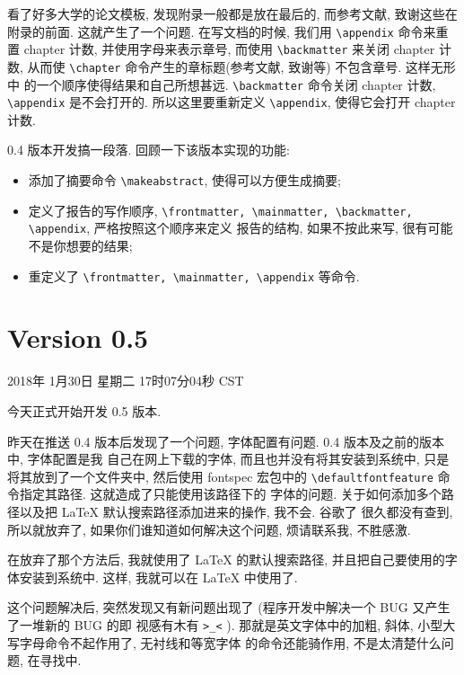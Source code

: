 \documentclass{cugrep}
\begin{document}
看了好多大学的论文模板, 发现附录一般都是放在最后的, 而参考文献, 致谢这些在附录的前面. 这就产生了一个问题.
在写文档的时候, 我们用 \verb|\appendix| 命令来重置 chapter 计数, 并使用字母来表示章号, 而使用 \verb|\backmatter| 
来关闭 chapter 计数, 从而使 \verb|\chapter| 命令产生的章标题(参考文献, 致谢等) 不包含章号. 这样无形中
的一个顺序使得结果和自己所想甚远. \verb|\backmatter| 命令关闭 chapter 计数, \verb|\appendix| 是不会打开的.
所以这里要重新定义 \verb|\appendix|, 使得它会打开 chapter 计数. 

0.4 版本开发搞一段落. 回顾一下该版本实现的功能:

\begin{itemize}
    \item 添加了摘要命令 \verb|\makeabstract|, 使得可以方便生成摘要;
    \item 定义了报告的写作顺序, \verb|\frontmatter, \mainmatter, \backmatter, \appendix|, 严格按照这个顺序来定义
        报告的结构, 如果不按此来写, 很有可能不是你想要的结果;
    \item 重定义了 \verb|\frontmatter, \mainmatter, \appendix| 等命令.
\end{itemize}

\section{Version 0.5}

2018年 1月30日 星期二 17时07分04秒 CST

今天正式开始开发 0.5 版本.

昨天在推送 0.4 版本后发现了一个问题, 字体配置有问题. 0.4 版本及之前的版本中, 字体配置是我
自己在网上下载的字体, 而且也并没有将其安装到系统中, 只是将其放到了一个文件夹中, 然后使用
fontspec 宏包中的 \verb|\defaultfontfeature| 命令指定其路径. 这就造成了只能使用该路径下的
字体的问题. 关于如何添加多个路径以及把 \LaTeX{} 默认搜索路径添加进来的操作, 我不会. 谷歌了
很久都没有查到, 所以就放弃了, 如果你们谁知道如何解决这个问题, 烦请联系我, 不胜感激. 

在放弃了那个方法后, 我就使用了 \LaTeX{} 的默认搜索路径, 并且把自己要使用的字体安装到系统中.
这样, 我就可以在 \LaTeX{} 中使用了. 

这个问题解决后, 突然发现又有新问题出现了 (程序开发中解决一个 BUG 又产生了一堆新的 BUG 的即
视感有木有 \verb|>_<| ). 那就是英文字体中的加粗, 斜体, 小型大写字母命令不起作用了, 无衬线和等宽字体
的命令还能骑作用, 不是太清楚什么问题, 在寻找中.
\end{document}
